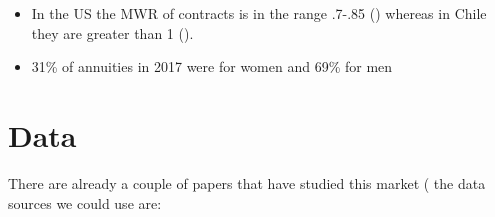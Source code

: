 \documentclass[12pt]{article}
\theoremstyle{plain}
\theoremstyle{plain}
\begin{document}
\begin{itemize}
    \item In the US the MWR of contracts is in the range .7-.85 (\cite{noauthor_lecture_annuities_nodate}) whereas in Chile they are greater than 1 (\cite{quiroz_estudio_2018}). 
    \item 31\% of annuities in 2017 were for women and 69\% for men 
\end{itemize}

\section{Data}
There are already a couple of papers that have studied this market (\cite{boehm_intermediation_2024,illanes_retirement_2019,alcalde_intermediary_nodate} the data sources we could use are: 
\end{document}
